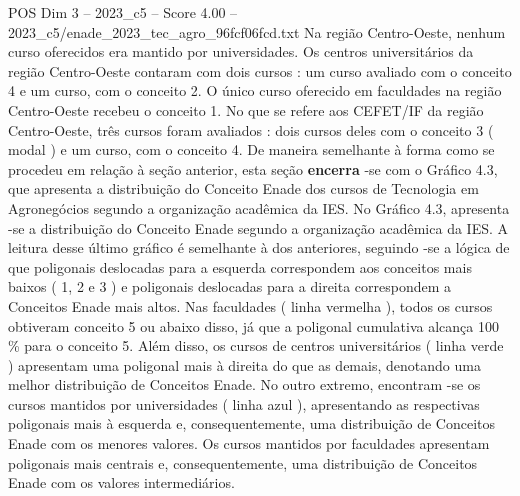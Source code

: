 \begin{textsample}{POS Dim 3 – 2023\_c5 – Score 4.00 – 2023\_c5/enade\_2023\_tec\_agro\_96fcf06fcd.txt}
Na região Centro-Oeste, nenhum curso oferecidos era mantido por universidades.
Os centros universitários da região Centro-Oeste contaram com dois cursos : um curso avaliado com o conceito 4 e um curso, com o conceito 2.
O único curso oferecido em faculdades na região Centro-Oeste recebeu o conceito 1.
No que se refere aos CEFET/IF da região Centro-Oeste, três cursos foram avaliados : dois cursos deles com o conceito 3 ( modal ) e um curso, com o conceito 4.
De maneira semelhante à forma como se procedeu em relação à seção anterior, esta seção \textbf{encerra} -se com o Gráfico 4.3, que apresenta a distribuição do Conceito Enade dos cursos de Tecnologia em Agronegócios segundo a organização acadêmica da IES.
No Gráfico 4.3, apresenta -se a distribuição do Conceito Enade segundo a organização acadêmica da IES.
A leitura desse último gráfico é semelhante à dos anteriores, seguindo -se a lógica de que poligonais deslocadas para a esquerda correspondem aos conceitos mais baixos ( 1, 2 e 3 ) e poligonais deslocadas para a direita correspondem a Conceitos Enade mais altos.
Nas faculdades ( linha vermelha ), todos os cursos obtiveram conceito 5 ou abaixo disso, já que a poligonal cumulativa alcança 100 \% para o conceito 5.
Além disso, os cursos de centros universitários ( linha verde ) apresentam uma poligonal mais à direita do que as demais, denotando uma melhor distribuição de Conceitos Enade.
No outro extremo, encontram -se os cursos mantidos por universidades ( linha azul ), apresentando as respectivas poligonais mais à esquerda e, consequentemente, uma distribuição de Conceitos Enade com os menores valores.
Os cursos mantidos por faculdades apresentam poligonais mais centrais e, consequentemente, uma distribuição de Conceitos Enade com os valores intermediários.

\end{textsample}
